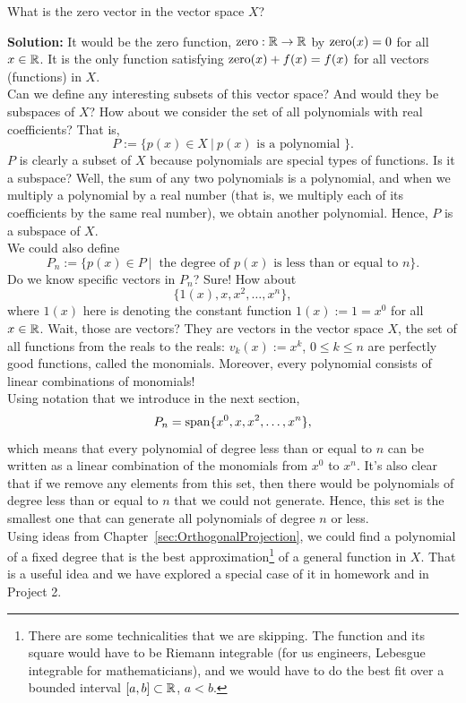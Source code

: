 \begin{example} What is the zero vector in the vector space $X$?   
\end{example}

\textbf{Solution:} It would be the zero function, ${\rm zero}:\mathbb R \to \mathbb R$ by ${\rm zero}(x) = 0$ for all $x \in \mathbb R$. It is the only function satisfying ${\rm zero}(x) + f(x) = f(x)$ for all vectors (functions) in $X$.
\Qed\\

Can we define any interesting subsets of this vector space? And would they be subspaces of $X$? How about we consider the set of all polynomials with real coefficients? That is, 
$$P:=\{ p(x) \in X~|~ p(x) \text{ is a polynomial } \}.$$
$P$ is clearly a subset of $X$ because polynomials are special types of functions. Is it a subspace? Well, the sum of any two polynomials is a polynomial, and when we multiply a polynomial by a real number (that is, we multiply each of its coefficients by the same real number), we obtain another polynomial. Hence, $P$ is a subspace of $X$. \\

We could also define
$$ P_n:=\{ p(x) \in P~|~ \text{ the degree of }p(x) \text{ is less than or equal to }n \}.$$
Do we know specific vectors in $P_n$? Sure! How about 
$$ \{ 1(x), x, x^2, \ldots, x^n \},$$
where $1(x)$ here is denoting the constant function $1(x):=1=x^0$ for all $x\in \mathbb R$. Wait, those are vectors? They are vectors in the vector space $X$, the set of all functions from the reals to the reals: $v_k(x):=x^k$, $0 \le k \le n$ are perfectly good functions, called the monomials. Moreover, every polynomial consists of linear combinations of monomials!\\

Using notation that we introduce in the next section,
$$ P_n = \mathrm{span} \{ x^0, x, x^2, \ldots, x^n \},$$
which means that every polynomial of degree less than or equal to $n$ can be written as a linear combination of the monomials from $x^0$ to $x^n$. It's also clear that if we remove any elements from this set, then there would be polynomials of degree less than or equal to $n$ that we could not generate. Hence, this set is the smallest one that can generate all polynomials of degree $n$ or less.\\


Using ideas from Chapter~\ref{sec:OrthogonalProjection}, we could find a polynomial of a fixed degree that is the best approximation\footnote{There are some technicalities that we are skipping. The function and its square would have to be Riemann integrable (for us engineers, Lebesgue integrable for mathematicians), and we would have to do the best fit over a bounded interval $[a, b]\subset \mathbb R$, $a < b$.} of a general function in $X$. That is a useful idea and we have explored a special case of it in homework and in Project 2. 



